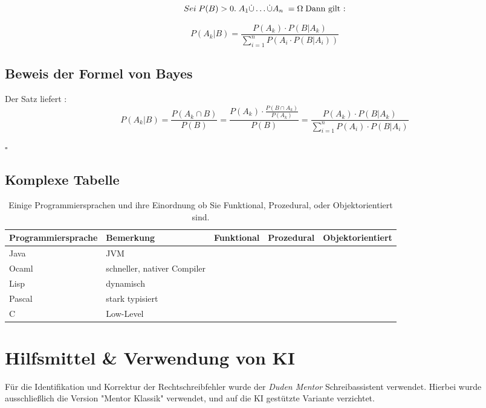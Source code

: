 \documentclass[paper=a4,fontsize=12pt,ngerman]{scrartcl}
\newcommand{\cmark}{\ding{51}}
\newcommand{\xmark}{\ding{55}}
\begin{document}
\[
Sei \; P(B)>0. \; A_1 \dot{\cup} \ldots \dot{\cup} A_n \;  =\Omega \; \text{Dann gilt :} \newline
\]

\[
P(A_k | B) = \frac{P(A_k)  \cdot P(B | A_k)}{\sum_{i=1}^{n}P(A_i  \cdot P(B | A_i))}
\]

\subsection{Beweis der Formel von Bayes}

Der Satz liefert : 
\[ 
P(A_k | B) = \frac{P(A_k \cap B)}{P(B)} = \frac{P(A_k) \cdot \frac{P(B \cap A_k)}{P(A_k)}} {P(B)} = \frac{P(A_k) \cdot P(B | A_k)}{ \sum_{i=1}^{n}P(A_i) \cdot P(B | A_i)}
\]

$\square$

\subsection{Komplexe Tabelle}

\begin{table}[ht]
    \centering

    \begin{adjustbox}{max width=0.8\textwidth}


        \begin{tabular}{@{} l l c c c @{}}
        \toprule

        \textbf{Programmiersprache} & \textbf{Bemerkung} & \textbf{Funktional} & \textbf{Prozedural} & \textbf{Objektorientiert} \\
        \midrule
            
            Java & JVM & \xmark & \xmark & \cmark   \\
            Ocaml & schneller, nativer Compiler & \cmark & \xmark & \xmark \\
            Lisp & dynamisch & \cmark & \xmark & \xmark \\
            Pascal & stark typisiert & \xmark & \cmark & \xmark \\ 
            C & Low-Level & \xmark & \cmark & \xmark \\

        \bottomrule

            
        \end{tabular}
    
    \end{adjustbox}

    \caption{Einige Programmiersprachen und ihre Einordnung ob Sie Funktional, Prozedural,
     oder Objektorientiert sind.}
    \label{tab:compar}
    
\end{table}


\section{Hilfsmittel \& Verwendung von KI}
Für die Identifikation und Korrektur der Rechtschreibfehler wurde der \textit{Duden Mentor} Schreibassistent 
verwendet. Hierbei wurde ausschließlich die Version "Mentor Klassik" verwendet, und auf die KI gestützte Variante
verzichtet. 
\end{document}
